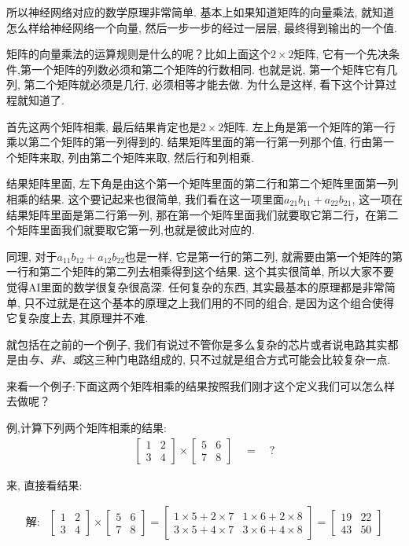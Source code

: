 所以神经网络对应的数学原理非常简单. 基本上如果知道矩阵的向量乘法, 就知道怎么样给神经网络一个向量, 然后一步一步的经过一层层, 最终得到输出的一个值. 

矩阵的向量乘法的运算规则是什么的呢？比如上面这个$2\times2$矩阵, 它有一个先决条件,第一个矩阵的列数必须和第二个矩阵的行数相同. 也就是说, 第一个矩阵它有几列, 第二个矩阵就必须是几行, 必须相等才能去做. 为什么是这样, 看下这个计算过程就知道了. 

首先这两个矩阵相乘, 最后结果肯定也是$2\times2$矩阵. 左上角是第一个矩阵的第一行乘以第二个矩阵的第一列得到的. 结果矩阵里面的第一行第一列那个值, 行由第一个矩阵来取, 列由第二个矩阵来取, 然后行和列相乘. 

结果矩阵里面, 左下角是由这个第一个矩阵里面的第二行和第二个矩阵里面第一列相乘的结果. 这个要记起来也很简单, 我们看在这一项里面$a_{21}b_{11} + a_{22}b_{21}$, 这一项在结果矩阵里面是第二行第一列, 那在第一个矩阵里面我们就要取它第二行，在第二个矩阵里面我们就要取它第一列,也就是彼此对应的. 

同理, 对于$a_{11}b_{12}+a_{12}b_{22}$也是一样, 它是第一行的第二列, 就需要由第一个矩阵的第一行和第二个矩阵的第二列去相乘得到这个结果. 这个其实很简单, 所以大家不要觉得AI里面的数学很复杂很高深. 任何复杂的东西, 其实最基本的原理都是非常简单, 只不过就是在这个基本的原理之上我们用的不同的组合, 是因为这个组合使得它复杂度上去, 其原理并不难. 

就包括在之前的一个例子, 我们有说过不管你是多么复杂的芯片或者说电路其实都是由\textit{与、非、或}这三种门电路组成的, 只不过就是组合方式可能会比较复杂一点. 

来看一个例子:下面这两个矩阵相乘的结果按照我们刚才这个定义我们可以怎么样去做呢？

例,计算下列两个矩阵相乘的结果:
\begin{align*}
  \begin{bmatrix} 1 & 2 \\ 3 & 4  \end{bmatrix} \times \begin{bmatrix} 5 & 6 \\ 7 & 8 \end{bmatrix} \quad = \quad ?
\end{align*}

来, 直接看结果:

\begin{align*}
  \mbox{解:}
  & \begin{bmatrix} 1 & 2 \\ 3 & 4  \end{bmatrix} 
  \times \begin{bmatrix} 5 & 6 \\ 7 & 8 \end{bmatrix} 
  = \begin{bmatrix} 1\times5 + 2\times7 & 1\times6 + 2\times8 \\ 3\times5 + 4\times7 & 3\times6 + 4\times8 \end{bmatrix} 
  = \begin{bmatrix} 19 & 22 \\ 43 & 50 \end{bmatrix}
\end{align*}

